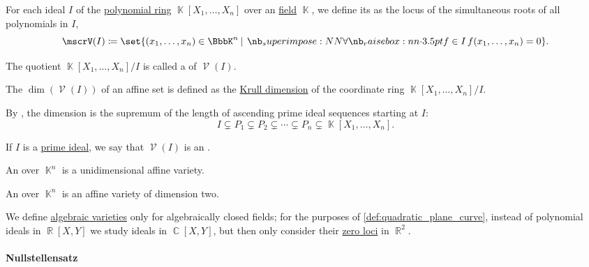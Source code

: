 \begin{definition}\label{def:affine_algebraic_set}
  For each ideal \( I \) of the \hyperref[def:polynomial_algebra]{polynomial ring} \( \BbbK[X_1, \ldots, X_n] \) over an  \hyperref[def:field]{field} \( \BbbK \), we define its  as the locus of the simultaneous roots of all polynomials in \( I \),
  \begin{equation*}
    \mscrV(I) \coloneqq \set{ (x_1, \ldots, x_n) \in \BbbK^n \given \qforall {f \in I} f(x_1, \ldots, x_n) = 0 }.
  \end{equation*}

  \begin{thmenum}
     The quotient \( \BbbK[X_1, \ldots, X_n] / I \) is called a  of \( \mscrV(I) \).

     The  \( \dim(\mscrV(I)) \) of an affine set is defined as the \hyperref[def:krull_dimension]{Krull dimension} of the coordinate ring \( \BbbK[X_1, \ldots, X_n] / I \).

    By , the dimension is the supremum of the length of ascending prime ideal sequences starting at \( I \):
    \begin{equation*}
      I \subsetneq P_1 \subsetneq P_2 \subsetneq \cdots \subsetneq P_n \subsetneq \BbbK[X_1, \ldots, X_n].
    \end{equation*}

     If \( I \) is a \hyperref[def:semiring_ideal/prime]{prime ideal}, we say that \( \mscrV(I) \) is an .

     An  over \( \BbbK^n \) is a unidimensional affine variety.

     An  over \( \BbbK^n \) is an affine variety of dimension two.
  \end{thmenum}
\end{definition}

\begin{remark}\label{rem:real_affine_varieties}
  We define \hyperref[def:affine_algebraic_set/variety]{algebraic varieties} only for algebraically closed fields; for the purposes of \cref{def:quadratic_plane_curve}, instead of polynomial ideals in \( \BbbR[X, Y] \) we study ideals in \( \BbbC[X, Y] \), but then only consider their \hyperref[def:root_of_polynomial]{zero loci} in \( \BbbR^2 \).
\end{remark}

\paragraph{Nullstellensatz}

\begin{theorem}[Nullstellensatz]\label{thm:hilberts_nullstellensatz}
\end{theorem}
